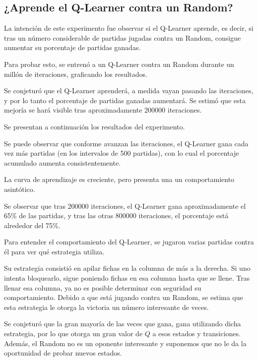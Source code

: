 \subsection{¿Aprende el Q-Learner contra un Random?}

La intención de este experimento fue observar si el Q-Learner aprende, es decir, si tras un número considerable de partidas jugadas contra un Random, consigue aumentar su porcentaje de partidas ganadas.

Para probar esto, se entrenó a un Q-Learner contra un Random durante un millón de iteraciones, graficando los resultados.

Se conjeturó que el Q-Learner aprenderá, a medida vayan pasando las iteraciones, y por lo tanto el porcentaje de partidas ganadas aumentará. Se estimó que esta mejoría se hará visible tras aproximadamente 200000 iteraciones.

Se presentan a continuación los resultados del experimento.


Se puede observar que conforme avanzan las iteraciones, el Q-Learner gana cada vez m\'as partidas (en los intervalos de 500 partidas), con lo cual el porcentaje acumulado aumenta consistentemente.

La curva de aprendizaje es creciente, pero presenta una un comportamiento asintótico.

Se observar que tras 200000 iteraciones, el Q-Learner gana aproximadamente el 65\% de las partidas, y tras las otras 800000 iteraciones, el porcentaje está alrededor del 75\%.

Para entender el comportamiento del Q-Learner, se jugaron varias partidas contra él para ver qué estrategia utiliza.

Su estrategia consistió en apilar fichas en la columna de más a la derecha. Si uno intenta bloquearlo, sigue poniendo fichas en esa columna hasta que se llene. Tras llenar esa columna, ya no es posible determinar con seguridad su comportamiento.
Debido a que está jugando contra un Random, se estima que esta estrategia le otorga la victoria un número interesante de veces.

Se conjeturó que la gran mayoría de las veces que gana, gana utilizando dicha estrategia, por lo que otorga un gran valor de $Q$ a esos estados y transiciones. Además, el Random no es un oponente interesante y suponemos que no le da la oportunidad de probar nuevos estados.

